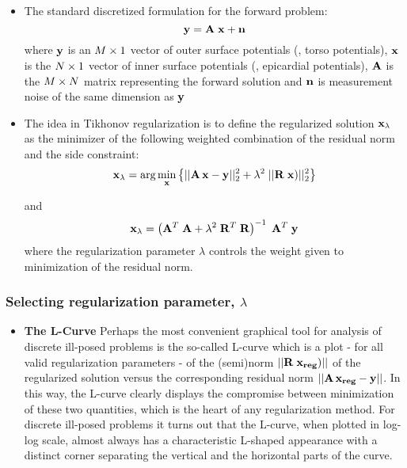 \begin{itemize}
  \item The standard discretized formulation for the forward problem:
        \begin{equation}
          \label{Eqn:prob}
          {\bf y} = {\bf A \; x} + {\bf n}
        \end{equation}
      where ${\bf y}$ is an $M\x1$ vector of outer surface potentials (\eg,
      torso potentials), ${\bf x}$ is the $N\x1$ vector of inner surface
      potentials (\eg, epicardial potentials), ${\bf A}$ is the $M\x N$
      matrix representing the forward solution and ${\bf n}$ is measurement
      noise of the same dimension as ${\bf y}$ 
             
  \item The idea in Tikhonov regularization is to define the regularized
        solution 
        ${\bf x}_{\lambda}$ as the minimizer of the following weighted
        combination 
        of the residual norm and the side constraint:  
        \begin{equation}
          {\bf x}_{\lambda} = \mbox{arg}\min_{{\bf x}}\left\{ ||{\bf A\,x}-{\bf
          y}||_{2}^{2} + \lambda^{2}\;||{\bf R\;x})||_{2}^{2}\right\}
        \end{equation}
      
      and          
        \begin{equation}         
          {\bf x}_{\lambda} = \left( {\bf A}^{T}\;{\bf A} + \lambda^{2}\;{\bf
          R}^{T}\;{\bf R}\right)^{-1}\; {\bf A}^{T}\;{\bf y}
        \end{equation}
      where the regularization parameter $\lambda$ controls the weight given to
      minimization of the residual norm. 
\end{itemize}         

\subsubsection{Selecting regularization parameter, $\lambda$}
\label{Sec:regpar}

\begin{itemize}
  \item {\bf The L-Curve}
        Perhaps the most convenient graphical tool for analysis of discrete
        ill-posed problems is the so-called L-curve which is a plot - for
        all valid regularization parameters - of the (semi)norm $||{\bf
        R\;x_{reg}})||$ of the regularized solution versus the
        corresponding residual norm $||{\bf A\,x_{reg}}-{\bf y}||$. In this
        way, the L-curve clearly displays the compromise between
        minimization of these two quantities, which is the heart of any
        regularization method. For discrete ill-posed problems it turns out
        that the L-curve, when plotted in log-log scale, almost always has
        a characteristic L-shaped appearance with a distinct corner
        separating the vertical and the horizontal parts of the curve.
        
\end{itemize}
             
